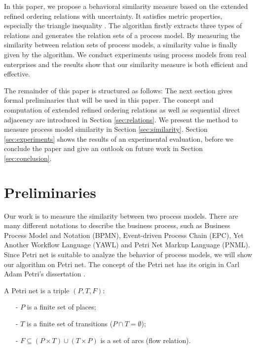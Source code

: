 \documentclass{llncs}
\begin{document}
In this paper, we propose a behavioral similarity measure based on the extended refined ordering relations with uncertainty. It satisfies metric properties, especially the triangle inequality \cite{zezula2006similarity}. The algorithm firstly extracts three types of relations and generates the relation sets of a process model. By measuring the similarity between relation sets of process models, a similarity value is finally given by the algorithm. We conduct experiments using process models from real enterprises and the results show that our similarity measure is both efficient and effective.

The remainder of this paper is structured as follows: The next section gives formal preliminaries that will be used in this paper. The concept and computation of extended refined ordering relations as well as sequential direct adjacency are introduced in Section \ref{sec:relations}. We present the method to measure process model similarity in Section \ref{sec:similarity}. Section \ref{sec:experiments} shows the results of an experimental evaluation, before we conclude the paper and give an outlook on future work in Section \ref{sec:conclusion}.

\section{Preliminaries}\label{sec:preliminaries}
Our work is to measure the similarity between two process models. There are many different notations to describe the business process, such as Business Process Model and Notation (BPMN), Event-driven Process Chain (EPC), Yet Another Workflow Language (YAWL) and Petri Net Markup Language (PNML). Since Petri net is suitable to analyze the behavior of process models, we will show our algorithm on Petri net. The concept of the Petri net has its origin in Carl Adam Petri's dissertation \cite{petri1966kommunikation}.

\begin{definition}\label{def:petrinet}
A Petri net is a triple $(P,T,F)$:
	\begin{itemize}
		\item[-] $P$ is a finite set of places;
		\item[-] $T$ is a finite set of transitions ($P\cap T=\emptyset$);
		\item[-] $F\subseteq(P\times T)\cup(T\times P)$ is a set of arcs (flow relation).
	\end{itemize}
\end{definition}
\end{document}
